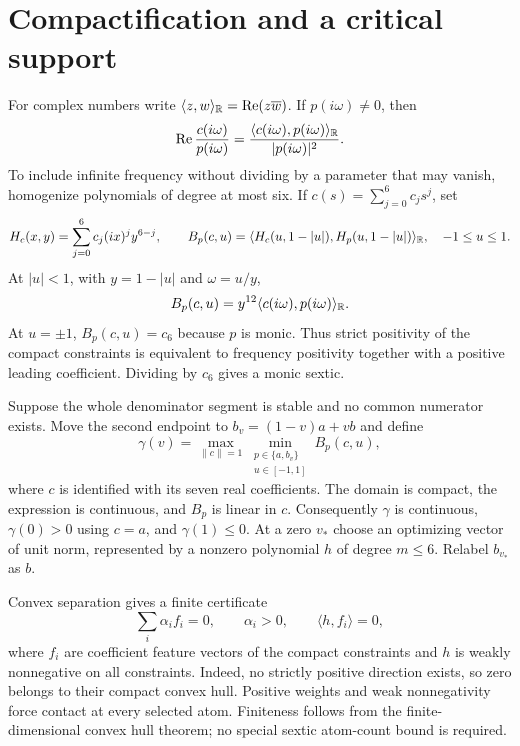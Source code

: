\documentclass[11pt]{article}
\begin{document}
\section{Compactification and a critical support}
For complex numbers write $\langle z,w\rangle_{\mathbb R}=\operatorname{Re}(z\overline w)$. If $p(i\omega)\ne0$, then
\begin{equation}\label{eq:pair}
 \operatorname{Re}\frac{c(i\omega)}{p(i\omega)}
 =\frac{\langle c(i\omega),p(i\omega)\rangle_{\mathbb R}}{|p(i\omega)|^2}.
\end{equation}
To include infinite frequency without dividing by a parameter that may vanish, homogenize polynomials of degree at most six. If $c(s)=\sum_{j=0}^6c_js^j$, set
\[
 H_c(x,y)=\sum_{j=0}^6c_j(ix)^jy^{6-j},\qquad
 B_p(c,u)=\langle H_c(u,1-|u|),H_p(u,1-|u|)\rangle_{\mathbb R},
 \quad -1\le u\le1.
\]
At $|u|<1$, with $y=1-|u|$ and $\omega=u/y$,
\begin{equation}\label{eq:compact}
 B_p(c,u)=y^{12}\langle c(i\omega),p(i\omega)\rangle_{\mathbb R}.
\end{equation}
At $u=\pm1$, $B_p(c,u)=c_6$ because $p$ is monic. Thus strict positivity of the compact constraints is equivalent to frequency positivity together with a positive leading coefficient. Dividing by $c_6$ gives a monic sextic.

Suppose the whole denominator segment is stable and no common numerator exists. Move the second endpoint to $b_v=(1-v)a+vb$ and define
\[
 \gamma(v)=\max_{\|c\|=1}\min_{\substack{p\in\{a,b_v\}\\u\in[-1,1]}}B_p(c,u),
\]
where $c$ is identified with its seven real coefficients. The domain is compact, the expression is continuous, and $B_p$ is linear in $c$. Consequently $\gamma$ is continuous, $\gamma(0)>0$ using $c=a$, and $\gamma(1)\le0$. At a zero $v_*$ choose an optimizing vector of unit norm, represented by a nonzero polynomial $h$ of degree $m\le6$. Relabel $b_{v_*}$ as $b$.

Convex separation gives a finite certificate
\begin{equation}\label{eq:balance}
 \sum_i\alpha_i f_i=0,\qquad\alpha_i>0,\qquad
 \langle h,f_i\rangle=0,
\end{equation}
where $f_i$ are coefficient feature vectors of the compact constraints and $h$ is weakly nonnegative on all constraints. Indeed, no strictly positive direction exists, so zero belongs to their compact convex hull. Positive weights and weak nonnegativity force contact at every selected atom. Finiteness follows from the finite-dimensional convex hull theorem; no special sextic atom-count bound is required.
\end{document}
